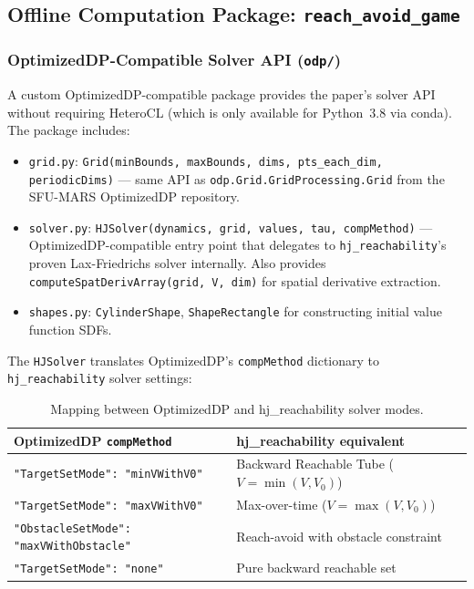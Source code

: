 \documentclass[11pt,a4paper]{article}
\begin{document}
\subsection{Offline Computation Package: \texttt{reach\_avoid\_game}}

\subsubsection{OptimizedDP-Compatible Solver API (\texttt{odp/})}

A custom OptimizedDP-compatible package provides the paper's solver API without requiring HeteroCL (which is only available for Python~3.8 via conda). The package includes:

\begin{itemize}
    \item \texttt{grid.py}: \texttt{Grid(minBounds, maxBounds, dims, pts\_each\_dim, periodicDims)} --- same API as \texttt{odp.Grid.GridProcessing.Grid} from the SFU-MARS OptimizedDP repository.
    \item \texttt{solver.py}: \texttt{HJSolver(dynamics, grid, values, tau, compMethod)} --- OptimizedDP-compatible entry point that delegates to \texttt{hj\_reachability}'s proven Lax-Friedrichs solver internally. Also provides \texttt{computeSpatDerivArray(grid, V, dim)} for spatial derivative extraction.
    \item \texttt{shapes.py}: \texttt{CylinderShape}, \texttt{ShapeRectangle} for constructing initial value function SDFs.
\end{itemize}

The \texttt{HJSolver} translates OptimizedDP's \texttt{compMethod} dictionary to \texttt{hj\_reachability} solver settings:

\begin{table}[h]
\centering
\small
\caption{Mapping between OptimizedDP and hj\_reachability solver modes.}
\begin{tabular}{lp{6cm}}
\toprule
\textbf{OptimizedDP \texttt{compMethod}} & \textbf{hj\_reachability equivalent} \\
\midrule
\texttt{"TargetSetMode": "minVWithV0"} & Backward Reachable Tube ($V = \min(V, V_0)$) \\
\texttt{"TargetSetMode": "maxVWithV0"} & Max-over-time ($V = \max(V, V_0)$) \\
\texttt{"ObstacleSetMode": "maxVWithObstacle"} & Reach-avoid with obstacle constraint \\
\texttt{"TargetSetMode": "none"} & Pure backward reachable set \\
\bottomrule
\end{tabular}
\end{table}
\end{document}
